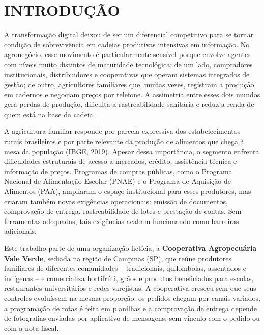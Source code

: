 \documentclass[12pt,a4paper]{article}
\begin{document}


\newpage
\pagestyle{abnt}
\section*{INTRODUÇÃO}

A transformação digital deixou de ser um diferencial competitivo para se tornar
condição de sobrevivência em cadeias produtivas intensivas em informação. No
agronegócio, esse movimento é particularmente sensível porque envolve agentes com
níveis muito distintos de maturidade tecnológica: de um lado, compradores
institucionais, distribuidores e cooperativas que operam sistemas integrados de
gestão; de outro, agricultores familiares que, muitas vezes, registram a produção
em cadernos e negociam preços por telefone. A assimetria entre esses dois mundos
gera perdas de produção, dificulta a rastreabilidade sanitária e reduz a renda de
quem está na base da cadeia.

A agricultura familiar responde por parcela expressiva dos estabelecimentos
rurais brasileiros e por parte relevante da produção de alimentos que chega à
mesa da população (IBGE, 2019). Apesar dessa importância, o segmento enfrenta
dificuldades estruturais de acesso a mercados, crédito, assistência técnica e
informação de preços. Programas de compras públicas, como o Programa Nacional de
Alimentação Escolar (PNAE) e o Programa de Aquisição de Alimentos (PAA),
ampliaram o espaço institucional para esses produtores, mas criaram também novas
exigências operacionais: emissão de documentos, comprovação de entrega,
rastreabilidade de lotes e prestação de contas. Sem ferramentas adequadas, tais
exigências acabam funcionando como barreiras adicionais.

Este trabalho parte de uma organização fictícia, a \textbf{Cooperativa
Agropecuária Vale Verde}, sediada na região de Campinas (SP), que reúne
produtores familiares de diferentes comunidades -- tradicionais, quilombolas,
assentados e indígenas -- e comercializa hortifrúti, grãos e produtos
beneficiados para escolas, restaurantes universitários e redes varejistas. A
cooperativa cresceu sem que seus controles evoluíssem na mesma proporção: os
pedidos chegam por canais variados, a programação de rotas é feita em planilhas
e a comprovação de entrega depende de fotografias enviadas por aplicativo de
mensagens, sem vínculo com o pedido ou com a nota fiscal.
\end{document}
